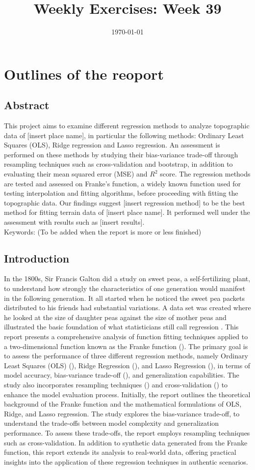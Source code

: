 \documentclass[12pt,
               a4paper,
               article,
               oneside,
               english,oldfontcommands]{memoir}
\date{\today}
\title{Weekly Exercises: Week 39}
\begin{document}
\header{}
\section*{\centering Outlines of the reoport}
\subsection{\centering Abstract}
This project aims to examine different regression methods to analyze topographic data of [insert place name], in particular the following methods: Ordinary Least Squares (OLS), Ridge regression and Lasso regression. An assessment is performed on these methods by studying their bias-variance trade-off through resampling techniques such as cross-validation and bootstrap, in addition to evaluating their mean squared error (MSE) and $R^2$ score. The regression methods are tested and assessed on Franke’s function, a widely known function used for testing interpolation and fitting algorithms, before proceeding with fitting the topographic data. Our findings suggest [insert regression method] to be the best method for fitting terrain data of [insert place name]. It performed well under the assessment with results such as [insert results].\\
Keywords: (To be added when the report is more or less finished)

\subsection*{Introduction}
In the 1800s, Sir Francis Galton did a study on sweet peas, a self-fertilizing plant, to understand how strongly the characteristics of one generation would manifest in the following generation. It all started when he noticed the sweet pea packets distributed to his friends had substantial variations. A data set was created where he looked at the size of daughter peas against the size of mother peas and illustrated the basic foundation of what statisticians still call regression \cite{peas}. This report presents a comprehensive analysis of function fitting techniques applied to a two-dimensional function known as the Franke function (\cite{franke}). The primary goal is to assess the performance of three different regression methods, namely Ordinary Least Squares (OLS) (\cite{OLS}), Ridge Regression (\cite{Ridge and Lasso}), and Lasso Regression (\cite{Ridge and Lasso}), in terms of model accuracy, bias-variance trade-off (\cite{bias variance trade off}), and generalization capabilities. The study also incorporates resampling techniques (\cite{bootstrap}) and cross-validation (\cite{bootstrap}) to enhance the model evaluation process. Initially, the report outlines the theoretical background of the Franke function and the mathematical formulations of OLS, Ridge, and Lasso regression. The study explores the bias-variance trade-off, to understand the trade-offs between model complexity and generalization performance. To assess these trade-offs, the report employs resampling techniques such as cross-validation. In addition to synthetic data generated from the Franke function, this report extends its analysis to real-world data, offering practical insights into the application of these regression techniques in authentic scenarios. 
\end{document}
